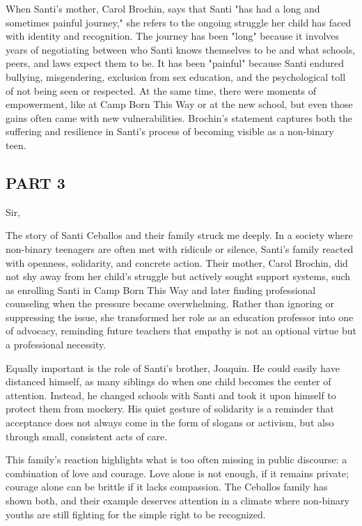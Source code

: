 \documentclass[11pt,a4paper,oneside]{article}
\begin{document}
	When Santi’s mother, Carol Brochin, says that Santi "has had a long and sometimes painful journey," she refers to the ongoing struggle her child has faced with identity and recognition. The journey has been "long" because it involves years of negotiating between who Santi knows themselves to be and what schools, peers, and laws expect them to be. It has been "painful" because Santi endured bullying, misgendering, exclusion from sex education, and the psychological toll of not being seen or respected. At the same time, there were moments of empowerment, like at Camp Born This Way or at the new school, but even those gains often came with new vulnerabilities. Brochin’s statement captures both the suffering and resilience in Santi’s process of becoming visible as a non-binary teen.
	
	\subsection*{PART 3}
	Sir,
	
	The story of Santi Ceballos and their family struck me deeply. In a society where non-binary teenagers are often met with ridicule or silence, Santi’s family reacted with openness, solidarity, and concrete action. Their mother, Carol Brochin, did not shy away from her child’s struggle but actively sought support systems, such as enrolling Santi in Camp Born This Way and later finding professional counseling when the pressure became overwhelming. Rather than ignoring or suppressing the issue, she transformed her role as an education professor into one of advocacy, reminding future teachers that empathy is not an optional virtue but a professional necessity.
	
	Equally important is the role of Santi’s brother, Joaquin. He could easily have distanced himself, as many siblings do when one child becomes the center of attention. Instead, he changed schools with Santi and took it upon himself to protect them from mockery. His quiet gesture of solidarity is a reminder that acceptance does not always come in the form of slogans or activism, but also through small, consistent acts of care.
	
	This family’s reaction highlights what is too often missing in public discourse: a combination of love and courage. Love alone is not enough, if it remains private; courage alone can be brittle if it lacks compassion. The Ceballos family has shown both, and their example deserves attention in a climate where non-binary youths are still fighting for the simple right to be recognized.
	
\end{document}

